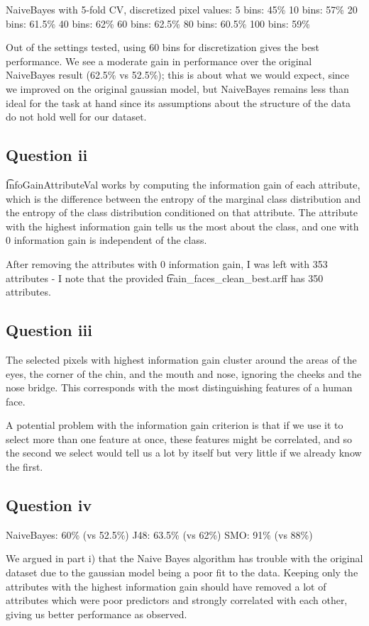 \documentclass[a4paper]{article}
\begin{document}
NaiveBayes with 5-fold CV, discretized pixel values:
5 bins:  45\%
10 bins: 57\%
20 bins: 61.5\%
40 bins: 62\%
60 bins: 62.5\%
80 bins: 60.5\%
100 bins: 59\%

Out of the settings tested, using 60 bins for discretization gives the best performance. We see a moderate gain in performance over the original NaiveBayes result (62.5\% vs 52.5\%); this is about what we would expect, since we improved on the original gaussian model, but NaiveBayes remains less than ideal for the task at hand since its assumptions about the structure of the data do not hold well for our dataset.

\subsection*{Question ii}
\t{InfoGainAttributeVal} works by computing the information gain of each attribute, which is the difference between the entropy of the marginal class distribution and the entropy of the class distribution conditioned on that attribute. The attribute with the highest information gain tells us the most about the class, and one with 0 information gain is independent of the class.

After removing the attributes with 0 information gain, I was left with 353 attributes - I note that the provided \t{train_faces_clean_best.arff} has 350 attributes.

\subsection*{Question iii}
The selected pixels with highest information gain cluster around the areas of the eyes, the corner of the chin, and the mouth and nose, ignoring the cheeks and the nose bridge. This corresponds with the most distinguishing features of a human face.



A potential problem with the information gain criterion is that if we use it to select more than one feature at once, these features might be correlated, and so the second we select would tell us a lot by itself but very little if we already know the first.

\subsection*{Question iv}
NaiveBayes: 60\% (vs 52.5\%)
J48: 63.5\% (vs 62\%)
SMO: 91\% (vs 88\%)

We argued in part i) that the Naive Bayes algorithm has trouble with the original dataset due to the gaussian model being a poor fit to the data. Keeping only the attributes with the highest information gain should have removed a lot of attributes which were poor predictors and strongly correlated with each other, giving us better performance as observed.
\end{document}
